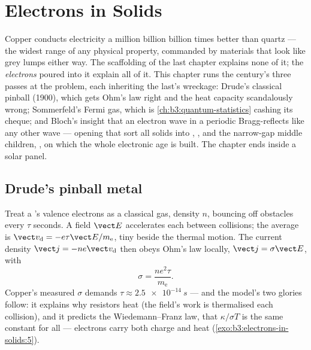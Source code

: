 \chapter{Electrons in Solids}\label{ch:b3:electrons-in-solids}


Copper conducts electricity a million billion billion times better
than quartz --- the widest range of any physical property, commanded
by materials that look like grey lumps either way. The scaffolding of
the last chapter explains none of it; the \emph{electrons} poured into
it explain all of it. This chapter runs the century's three passes at
the problem, each inheriting the last's wreckage: Drude's classical
pinball (1900), which gets Ohm's law right and the heat capacity
scandalously wrong; Sommerfeld's Fermi gas, which is
\cref{ch:b3:quantum-statistics} cashing its cheque; and Bloch's
insight that an electron wave in a periodic  Bragg-reflects
like any other wave --- opening \emph{} that sort all solids
into , , and the narrow-gap middle children,
, on which the whole electronic age is built. The
chapter ends inside a solar panel.

\section{Drude's pinball metal}

\begin{proposition}\label{prop:b3:electrons-in-solids:drude}
Treat a 's valence electrons as a classical gas, density $n$,
bouncing off obstacles every $\tau$ seconds. A field $\vect E$
accelerates each between collisions; the average \emph{} is $\vect v_{\text{d}} = -e\tau\vect E/m_{\text{e}}$,
tiny beside the thermal motion. The current density $\vect j =
-ne\vect v_{\text{d}}$ then obeys Ohm's law locally,
$\vect j = \sigma\vect E$, with
\[
\sigma = \frac{ne^2\tau}{m_{\text{e}}} .
\]
Copper's measured $\sigma$ demands $\tau \approx \qty{2.5e-14}{s}$
--- and the model's two glories follow: it explains why resistors
heat (the field's work is thermalised each collision), and it
predicts the Wiedemann--Franz law, that $\kappa/\sigma T$ is the
same constant for all  --- electrons carry both charge and
heat (\cref{exo:b3:electrons-in-solids:5}).
\end{proposition}

